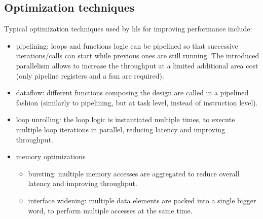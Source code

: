 \documentclass[11pt,a4paper,oneside]{memoir}
\begin{document}
\subsection{Optimization techniques}
Typical optimization techniques used by \ac{hls} for improving performance
include:
\begin{itemize}
	\item pipelining: loops and functions logic can be pipelined so that
		successive iterations/calls can start while previous ones are
		still running. The introduced parallelism allows to increase
		the throughput at a limited additional area cost (only pipeline
		registers and a \acs{fsm} are required).
	\item dataflow: different functions composing the design are called in
		a pipelined fashion (similarly to pipelining, but at task level,
		instead of instruction level).
	\item loop unrolling: the loop logic is instantiated multiple times,
		to execute multiple loop iterations in parallel, reducing
		latency and improving throughput.
	\item memory optimizations
		\begin{itemize}
			\item bursting: multiple memory accesses are aggregated
				to reduce overall latency and improving
				throughput.
			\item interface widening: multiple data elements are
				packed into a single bigger word, to perform
				multiple accesses at the same time.
		\end{itemize}
\end{itemize}

\end{document}
